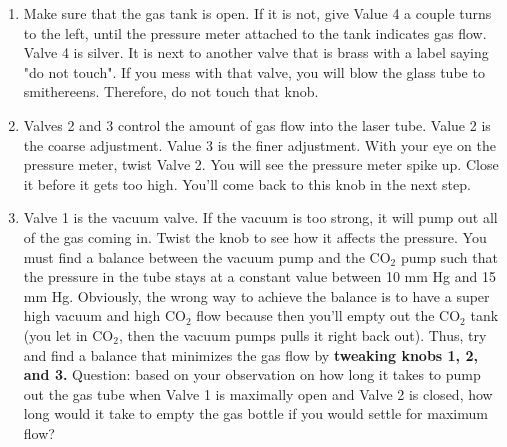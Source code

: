 \documentclass{../lab}
\begin{document}
\begin{enumerate}
    \item Make sure that the gas tank is open. If it is not, give Value 4 a couple turns to the left, until the pressure meter attached to the tank indicates gas flow. Valve 4 is silver. It is next to another valve that is brass with a label saying "do not touch". If you mess with that valve, you will blow the glass tube to smithereens. Therefore, do not touch that knob.
    
    \item Valves 2 and 3 control the amount of gas flow into the laser tube. Value 2 is the coarse adjustment. Value 3 is the finer adjustment. With your eye on the pressure meter, twist Valve 2. You will see the pressure meter spike up. Close it before it gets too high. You'll come back to this knob in the next step.
    
    \item Valve 1 is the vacuum valve. If the vacuum is too strong, it will pump out all of the gas coming in. Twist the knob to see how it affects the pressure. You must find a balance between the vacuum pump and the CO$_2$ pump such that the pressure in the tube stays at a constant value between 10 mm Hg and 15 mm Hg. Obviously, the wrong way to achieve the balance is to have a super high vacuum and high CO$_2$ flow because then you'll empty out the CO$_2$ tank (you let in CO$_2$, then the vacuum pumps pulls it right back out).  Thus, try and find a balance that minimizes the gas flow by \textbf{tweaking knobs 1, 2, and 3.} 
    Question: based on your observation on how long it takes to pump out the gas tube when Valve 1 is maximally open and Valve 2 is closed, how long would it take to empty the gas bottle if you would settle for maximum flow?






\end{enumerate}
\end{document}
